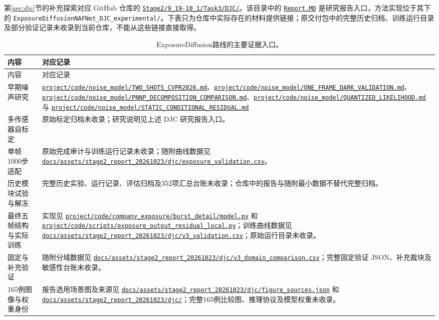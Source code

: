 \documentclass[11pt,a4paper,UTF8,fontset=fandol]{ctexart}
\newcommand{\repofile}[1]{\href{https://github.com/JingZe-Liang/SigmaStar_AIISP/blob/main/Stage2/9_19-10_1/Task3/XWJ/RECOVERED_Stage2_DenoiseModel_20261010/#1}{\nolinkurl{#1}}}
\newcommand{\repodir}[1]{\href{https://github.com/JingZe-Liang/SigmaStar_AIISP/tree/main/Stage2/9_19-10_1/Task3/XWJ/RECOVERED_Stage2_DenoiseModel_20261010/#1}{\nolinkurl{#1}}}
\newcommand{\djcfile}[1]{\href{https://github.com/JingZe-Liang/SigmaStar_AIISP/blob/main/Stage2/9_19-10_1/Task3/DJC/ExposureDiffusionNAFNet_DJC_experimental/#1}{\nolinkurl{#1}}}
\renewcommand{\arraystretch}{1.16}
\begin{document}
第\ref{sec:djc}节的补充探索对应 GitHub 仓库的 \href{https://github.com/JingZe-Liang/SigmaStar_AIISP/tree/main/Stage2/9_19-10_1/Task3/DJC}{\nolinkurl{Stage2/9_19-10_1/Task3/DJC/}}。该目录中的 \href{https://github.com/JingZe-Liang/SigmaStar_AIISP/blob/main/Stage2/9_19-10_1/Task3/DJC/Report.MD}{\nolinkurl{Report.MD}} 是研究报告入口，方法实现位于其下的 \nolinkurl{ExposureDiffusionNAFNet_DJC_experimental/}。下表只为仓库中实际存在的材料提供链接；原交付包中的完整历史归档、训练运行目录及部分验证记录未收录到当前仓库，不能从这些链接直接取得。
{\linespread{1}\footnotesize\renewcommand{\arraystretch}{1.05}
\begin{longtable}{P{0.20\textwidth}P{0.74\textwidth}}
\caption{ExposureDiffusion路线的主要证据入口。}\label{tab:djc_sources}\\
\toprule
内容 & 对应记录 \\
\midrule
\endfirsthead
\toprule
内容 & 对应记录 \\
\midrule
\endhead
\bottomrule
\endfoot
早期噪声研究 & \djcfile{project/code/noise_model/TWO_SHOTS_CVPR2026.md}、\djcfile{project/code/noise_model/ONE_FRAME_DARK_VALIDATION.md}、\djcfile{project/code/noise_model/PNNP_DECOMPOSITION_COMPARISON.md}、\djcfile{project/code/noise_model/QUANTIZED_LIKELIHOOD.md} 与 \djcfile{project/code/noise_model/STATIC_CONDITIONAL_RESIDUAL.md} \\
多传感器自标定 & 原始标定归档未收录；研究说明见上述 DJC 研究报告入口。 \\
单帧1000步适配 & 原始完成审计与训练运行记录未收录；随附曲线数据见 \repofile{docs/assets/stage2_report_20261023/djc/exposure_validation.csv}。 \\
历史模块试验与解冻 & 完整历史实验、运行记录、评估归档及352项汇总台账未收录；仓库中的报告与随附最小数据不替代完整归档。 \\
最终五帧结构与实际训练 & 实现见 \djcfile{project/code/company_exposure/burst_detail/model.py} 和 \djcfile{project/code/scripts/exposure_output_residual_local.py}；训练曲线数据见 \repofile{docs/assets/stage2_report_20261023/djc/v3_validation.csv}；原始运行目录未收录。 \\
固定与补充验证 & 随附分域数据见 \repofile{docs/assets/stage2_report_20261023/djc/v3_domain_comparison.csv}；完整固定验证 JSON、补充裁块及敏感性台账未收录。 \\
165例图像与权重身份 & 报告选用场景图及来源见 \repofile{docs/assets/stage2_report_20261023/djc/figure_sources.json} 和\repodir{docs/assets/stage2_report_20261023/djc/}；完整165例比较图、推理协议及模型权重未收录。 \\
\end{longtable}
}
\end{document}
